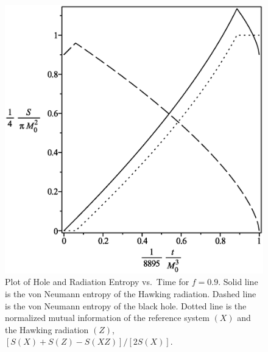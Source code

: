 \documentclass[12pt]{article}
\begin{document}
\begin{figure}[H]
\centering
\includegraphics[width=1\textwidth]{Hawking-hole-radiation-mutual-entropy-vs-time-graph-10f-is-9.eps}
\caption{Plot of Hole and Radiation Entropy vs.\ Time for $f=0.9$.
Solid line is the von Neumann entropy of the Hawking radiation.
Dashed line is the von Neumann entropy of the black hole.
Dotted line is the normalized mutual information of the reference system $(X)$ and the Hawking radiation $(Z)$, $[S(X)+S(Z)-S(XZ)]/[2S(X)]$.}
\end{figure}
\end{document}
